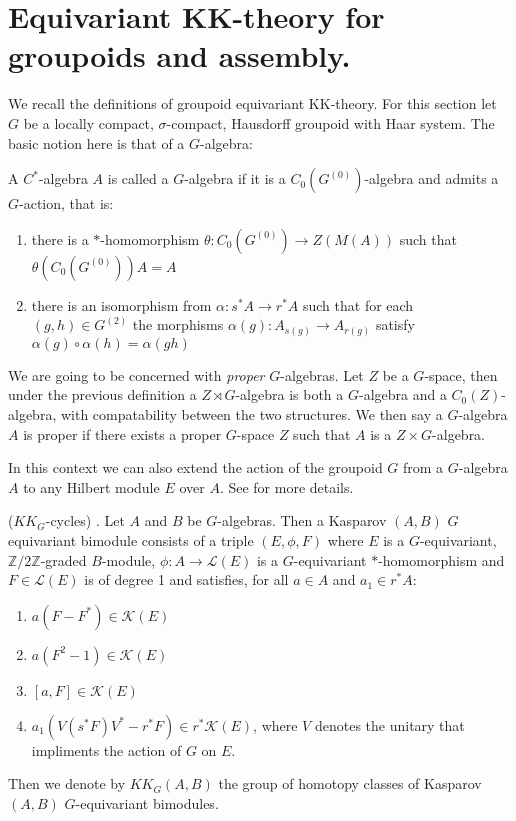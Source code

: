 \section{Equivariant KK-theory for groupoids and assembly.}
We recall the definitions of groupoid equivariant KK-theory. For this section let $G$ be a locally compact, $\sigma$-compact, Hausdorff groupoid with Haar system. The basic notion here is that of a $G$-algebra:
\begin{definition}
A $C^{*}$-algebra $A$ is called a $G$-algebra if it is a $C_{0}(G^{(0)})$-algebra and admits a $G$-action, that is:
\begin{enumerate}
\item there is a $*$-homomorphism $\theta: C_{0}(G^{(0)}) \rightarrow Z(M(A))$ such that $\theta(C_{0}(G^{(0)}))A = A$
\item there is an isomorphism from $\alpha: s^{*}A \rightarrow r^{*}A$ such that for each $(g,h) \in G^{(2)}$ the morphisms $\alpha(g):A_{s(g)} \rightarrow A_{r(g)}$ satisfy $\alpha(g)\circ \alpha(h) = \alpha(gh)$
\end{enumerate}
We are going to be concerned with \textit{proper} $G$-algebras. Let $Z$ be a $G$-space, then under the previous definition a $Z\rtimes G$-algebra is both a $G$-algebra and a $C_{0}(Z)$-algebra, with compatability between the two structures. We then say a $G$-algebra $A$ is proper if there exists a proper $G$-space $Z$ such that $A$ is a $Z\times G$-algebra.
\end{definition}

In this context we can also extend the action of the groupoid $G$ from a $G$-algebra $A$ to any Hilbert module $E$ over $A$. See \cite{MR1798599} for more details.

\begin{definition}($KK_{G}$-cycles) \cite{MR1686846,MR1703305,MR1798599}.
Let $A$ and $B$ be $G$-algebras. Then a Kasparov $(A,B)$ $G$ equivariant bimodule consists of a triple $(E,\phi, F)$ where $E$ is a $G$-equivariant, $\mathbb{Z}/2\mathbb{Z}$-graded $B$-module, $\phi: A \rightarrow \mathcal{L}(E)$ is a $G$-equivariant $*$-homomorphism and $F\in \mathcal{L}(E)$ is of degree 1 and satisfies, for all $a \in A$ and $a_{1} \in r^{*}A$:
\begin{enumerate}
\item $a(F - F^{*}) \in \mathcal{K}(E)$
\item $a(F^{2}- 1) \in \mathcal{K}(E)$
\item $[a,F] \in \mathcal{K}(E)$
\item $a_{1}(V(s^{*}F)V^{*}-r^{*}F) \in r^{*}\mathcal{K}(E)$, where $V$ denotes the unitary that impliments the action of $G$ on $E$.
\end{enumerate}
Then we denote by $KK_{G}(A,B)$ the group of homotopy classes of Kasparov $(A,B)$ $G$-equivariant bimodules. 
\end{definition}

